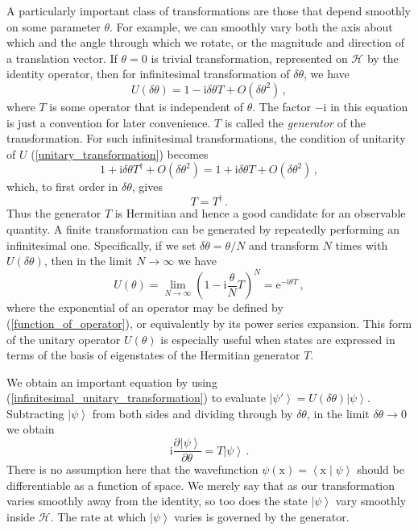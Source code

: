 \documentclass{article}
\theoremstyle{plain}\theoremheaderfont{\normalfont\itshape}\theorembodyfont{\rmfamily}\theoremseparator{.}\newtheorem*{rem}{Remark}\newtheorem*{ex}{Example}\newtheorem*{proof}{Proof}\newtheorem*{altp}{Alternative proof}
\theoremstyle{plain}\theoremheaderfont{\normalfont\bfseries}\theorembodyfont{\rmfamily}\theoremseparator{.}\newtheorem{thm}{Theorem}[section]\newtheorem{lem}[thm]{Lemma}\newtheorem{prop}[thm]{Proposition}\newtheorem*{cor}{Corollary}\newtheorem{defn}[thm]{Definition}\newtheorem{clm}[thm]{Claim}\newtheorem{clminproof}{Claim}
\theoremstyle{break}\theoremheaderfont{\normalfont\itshape}\theorembodyfont{\rmfamily}\theoremseparator{.\medskip}\newtheorem*{proofskip}{Proof}\newtheorem*{exs}{Examples}\newtheorem*{rems}{Remarks}
\theoremstyle{break}\theoremheaderfont{\normalfont\bfseries}\theorembodyfont{\rmfamily}\theoremseparator{.\medskip}\newtheorem{lemskip}[thm]{Lemma}\newtheorem{defnskip}[thm]{Definition}\newtheorem{propskip}[thm]{Proposition}\newtheorem{thmskip}[thm]{Theorem}
\numberwithin{equation}{section}
\newcommand{\ii}{\mathrm{i}}
\newcommand{\ee}{\mathrm{e}}
\newcommand{\pdv}[3][]{\frac{\partial^{#1} #2}{{\partial #3}^{#1}}}
\newcommand{\ket}[1]{\left| #1 \right\rangle}
\newcommand{\braket}[2]{\left\langle #1 \middle| #2 \right\rangle}
\newcommand{\vb}[1]{\bm{\mathrm{#1}}}
\newcommand{\hb}{\mathcal{H}}
\begin{document}
    A particularly important class of transformations are those that depend smoothly on some parameter \(\theta\). For example, we can smoothly vary both the axis about which and the angle through which we rotate, or the magnitude and direction of a translation vector. If \(\theta=0\) is trivial transformation, represented on \(\hb\) by the identity operator, then for infinitesimal transformation of \(\delta\theta\), we have
    \begin{equation}\label{infinitesimal_unitary_transformation}
        U(\delta\theta)=1-\ii\delta\theta T+O(\delta\theta^2)\,,
    \end{equation}
    where \(T\) is some operator that is independent of \(\theta\). The factor \(-\ii\) in this equation is just a convention for later convenience. \(T\) is called the \textit{generator} of the transformation. For such infinitesimal transformations, the condition of unitarity of \(U\) (\ref{unitary_transformation}) becomes
    \begin{equation}
        1+\ii\delta\theta T^\dagger+O(\delta\theta^2)=1+\ii\delta\theta T+O(\delta\theta^2)\,,
    \end{equation}
    which, to first order in \(\delta\theta\), gives
    \begin{equation}
        T=T^\dagger\,.
    \end{equation}
    Thus the generator \(T\) is Hermitian and hence a good candidate for an observable quantity. A finite transformation can be generated by repeatedly performing an infinitesimal one. Specifically, if we set \(\delta\theta=\theta/N\) and transform \(N\) times with \(U(\delta\theta)\), then in the limit \(N\to\infty\) we have
    \begin{equation}
        U(\theta)=\lim_{N\to\infty}\left(1-\ii\frac{\theta}{N}T\right)^N=\ee^{-\ii \theta T}\,,
    \end{equation}
    where the exponential of an operator may be defined by (\ref{function_of_operator}), or equivalently by its power series expansion. This form of the unitary operator \(U(\theta)\) is especially useful when states are expressed in terms of the basis of eigenstates of the Hermitian generator \(T\).

    We obtain an important equation by using (\ref{infinitesimal_unitary_transformation}) to evaluate \(\ket{\psi'}=U(\delta\theta)\ket{\psi}\). Subtracting \(\ket{\psi}\) from both sides and dividing through by \(\delta\theta\), in the limit \(\delta\theta\to 0\) we obtain
    \begin{equation}
        \ii\pdv{\ket{\psi}}{\theta}=T\ket{\psi}\,.
    \end{equation}
    There is no assumption here that the wavefunction \(\psi(\vb{x})=\braket{\vb{x}}{\psi}\) should be differentiable as a function of space. We merely say that as our transformation varies smoothly away from the identity, so too does the state \(\ket{\psi}\) vary smoothly inside \(\hb\). The rate at which \(\ket{\psi}\) varies is governed by the generator.
\end{document}
